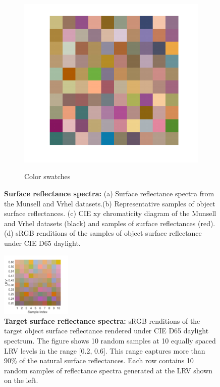 \documentclass{jov}
\begin{document}
\begin{figure}
\begin{subfigure}{0.24 \textwidth}
        \label{fig:xyChroReflectance}
    \end{subfigure}    
    \centering
	\begin{subfigure}{0.24 \textwidth}
    \centering
        \caption{Color swatches}
        \includegraphics[width=\textwidth]{../FiguresDraft4/Figure7/Figure7_d.pdf}
        \label{fig:backgroundSwatches}
    \end{subfigure}
    \caption{{\bf Surface reflectance spectra:} (a) Surface reflectance spectra from the Munsell and Vrhel datasets.(b) Representative samples of object surface reflectances. (c) CIE xy chromaticity diagram of the Munsell and Vrhel datasets (black) and samples of surface reflectances (red). (d) sRGB renditions of the samples of object surface reflectance under CIE D65 daylight.}
\label{fig:surfaceReflectanceGeneration}
\end{figure}

\begin{figure}
\centering
\includegraphics[width=0.3\textwidth]{../FiguresDraft4/Figure8/Figure8.pdf}
\caption{{\bf Target surface reflectance spectra:} sRGB renditions of the target object surface reflectance rendered under CIE D65 daylight spectrum. The figure shows 10 random samples at 10 equally spaced LRV levels in the range [0.2, 0.6]. This range captures more than 90\% of the natural surface reflectances. Each row contains 10 random samples of reflectance spectra generated at the LRV shown on the left.}
\label{fig:targetSwatches}
\end{figure}
\end{document}
